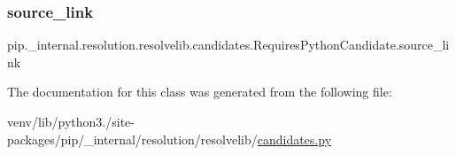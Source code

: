 \subsubsection{\texorpdfstring{source\+\_\+link}{source\_link}}
{\footnotesize\ttfamily pip.\+\_\+internal.\+resolution.\+resolvelib.\+candidates.\+Requires\+Python\+Candidate.\+source\+\_\+link\hspace{0.3cm}{\ttfamily [static]}}



The documentation for this class was generated from the following file\+:\begin{DoxyCompactItemize}
\item 
venv/lib/python3./site-\/packages/pip/\+\_\+internal/resolution/resolvelib/\hyperlink{candidates_8py}{candidates.\+py}\end{DoxyCompactItemize}
